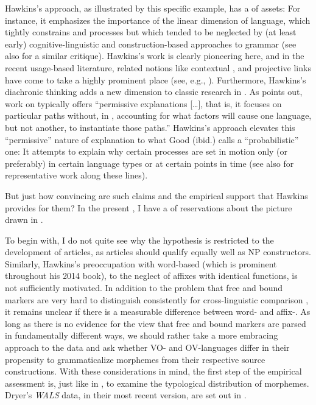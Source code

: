 \documentclass[output=paper]{langsci/langscibook}
\begin{document}
Hawkins’s approach, as illustrated by this specific example, has a  of assets: For instance, it emphasizes the importance of the linear dimension of language, which tightly constrains  and  processes but which tended to be neglected by (at least early) cognitive-linguistic and construction-based approaches to grammar (see also \citealt{Diessel2011_Review} for a similar critique). Hawkins’s work is clearly pioneering here, and in the recent usage-based literature, related notions like contextual ,  and projective links have come to take a highly prominent place (see, e.g., \citealt{GahlGarnsey2004,Levy2008_Exp,Auer2009_Online}). Furthermore, Hawkins’s diachronic thinking adds a new dimension to classic research in . As \citet[7]{Good2008_Intro} points out, work on  typically offers “permissive explanations […], that is, it focuses on particular  paths without, in , accounting for what factors will cause one language, but not another, to instantiate those paths.” Hawkins’s approach elevates this “permissive” nature of explanation to what Good (ibid.) calls a “probabilistic” one: It attempts to explain why certain  processes are set in motion only (or preferably) in certain language types or at certain points in time (see also \citealt{Hawkins1986_EngGer,Hawkins2012_Hist} for representative work along these lines).

But just how convincing are such claims and the empirical support that Hawkins provides for them? In the present , I have a  of reservations about the picture drawn in \citet{Hawkins2014_VarEff}.

To begin with, I do not quite see why the hypothesis is restricted to the development of  articles, as  articles should qualify equally well as NP constructors. Similarly, Hawkins’s preoccupation with word-based  (which is prominent throughout his 2014 book), to the neglect of affixes with identical functions, is not sufficiently motivated. In addition to the problem that free and bound markers are very hard to distinguish consistently for cross-linguistic comparison \citep{Haspelmath2011_Word}, it remains unclear if there is a measurable  difference between word- and affix-. As long as there is no evidence for the view that free and bound  markers are parsed in fundamentally different ways, we should rather take a more embracing approach to the data and ask whether VO- and OV-languages differ in their propensity to grammaticalize  morphemes from their respective source constructions.
\newpage
With these considerations in mind, the first step of the empirical assessment is, just like in \citet{Hawkins2014_VarEff}, to examine the typological distribution of  morphemes. Dryer’s \textit{WALS} data, in their most recent version, are set out in .
\end{document}
